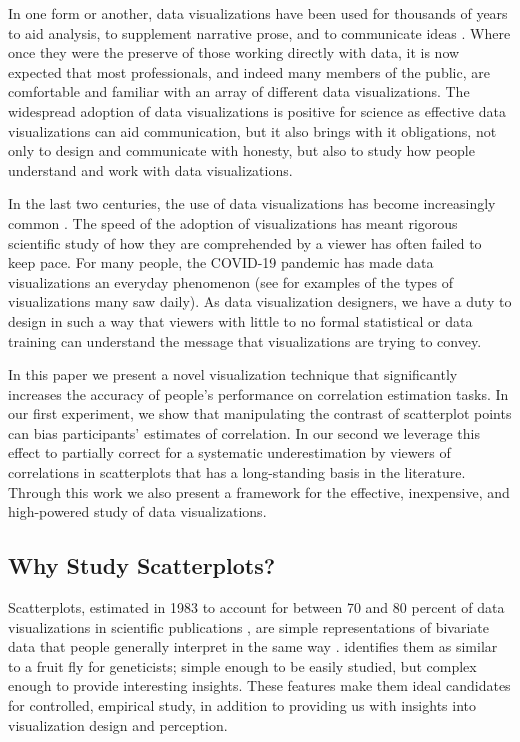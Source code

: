 \documentclass[preprint, 3p,
authoryear]{elsarticle} %
\begin{document}
In one form or another, data visualizations have been used for thousands
of years to aid analysis, to supplement narrative prose, and to
communicate ideas \citep{azzam_2013}. Where once they were the preserve
of those working directly with data, it is now expected that most
professionals, and indeed many members of the public, are comfortable
and familiar with an array of different data visualizations. The
widespread adoption of data visualizations is positive for science as
effective data visualizations can aid communication, but it also brings
with it obligations, not only to design and communicate with honesty,
but also to study how people understand and work with data
visualizations.

In the last two centuries, the use of data visualizations has become
increasingly common \citep{friendly_2005, azzam_2013}. The speed of the
adoption of visualizations has meant rigorous scientific study of how
they are comprehended by a viewer has often failed to keep pace. For
many people, the COVID-19 pandemic has made data visualizations an
everyday phenomenon (see \citet{bbc_2022} for examples of the types of
visualizations many saw daily). As data visualization designers, we have
a duty to design in such a way that viewers with little to no formal
statistical or data training can understand the message that
visualizations are trying to convey.

In this paper we present a novel visualization technique that
significantly increases the accuracy of people's performance on
correlation estimation tasks. In our first experiment, we show that
manipulating the contrast of scatterplot points can bias participants'
estimates of correlation. In our second we leverage this effect to
partially correct for a systematic underestimation by viewers of
correlations in scatterplots that has a long-standing basis in the
literature. Through this work we also present a framework for the
effective, inexpensive, and high-powered study of data visualizations.

\hypertarget{why-study-scatterplots}{%
\subsection{Why Study Scatterplots?}\label{why-study-scatterplots}}

Scatterplots, estimated in 1983 to account for between 70 and 80 percent
of data visualizations in scientific publications \citep{tufte_1983},
are simple representations of bivariate data that people generally
interpret in the same way \citep{kay_heer_2015}. \citet{rensink_2014}
identifies them as similar to a fruit fly for geneticists; simple enough
to be easily studied, but complex enough to provide interesting
insights. These features make them ideal candidates for controlled,
empirical study, in addition to providing us with insights into
visualization design and perception.
\end{document}
